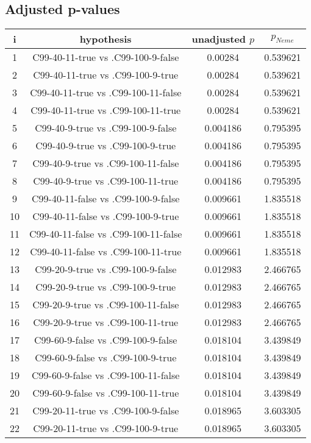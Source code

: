 \documentclass[a4paper,10pt]{article}
\begin{document}
\begin{landscape}
\pagebreak

\subsection{Adjusted p-values}

\begin{table}[!htp]
\centering\scriptsize
\begin{tabular}{cccc}
i&hypothesis&unadjusted $p$&$p_{Neme}$\\
\hline1&C99-40-11-true vs .C99-100-9-false&0.00284&0.539621\\
2&C99-40-11-true vs .C99-100-9-true&0.00284&0.539621\\
3&C99-40-11-true vs .C99-100-11-false&0.00284&0.539621\\
4&C99-40-11-true vs .C99-100-11-true&0.00284&0.539621\\
5&C99-40-9-true vs .C99-100-9-false&0.004186&0.795395\\
6&C99-40-9-true vs .C99-100-9-true&0.004186&0.795395\\
7&C99-40-9-true vs .C99-100-11-false&0.004186&0.795395\\
8&C99-40-9-true vs .C99-100-11-true&0.004186&0.795395\\
9&C99-40-11-false vs .C99-100-9-false&0.009661&1.835518\\
10&C99-40-11-false vs .C99-100-9-true&0.009661&1.835518\\
11&C99-40-11-false vs .C99-100-11-false&0.009661&1.835518\\
12&C99-40-11-false vs .C99-100-11-true&0.009661&1.835518\\
13&C99-20-9-true vs .C99-100-9-false&0.012983&2.466765\\
14&C99-20-9-true vs .C99-100-9-true&0.012983&2.466765\\
15&C99-20-9-true vs .C99-100-11-false&0.012983&2.466765\\
16&C99-20-9-true vs .C99-100-11-true&0.012983&2.466765\\
17&C99-60-9-false vs .C99-100-9-false&0.018104&3.439849\\
18&C99-60-9-false vs .C99-100-9-true&0.018104&3.439849\\
19&C99-60-9-false vs .C99-100-11-false&0.018104&3.439849\\
20&C99-60-9-false vs .C99-100-11-true&0.018104&3.439849\\
21&C99-20-11-true vs .C99-100-9-false&0.018965&3.603305\\
22&C99-20-11-true vs .C99-100-9-true&0.018965&3.603305\\

\end{tabular}
\end{table}
\end{landscape}
\end{document}
